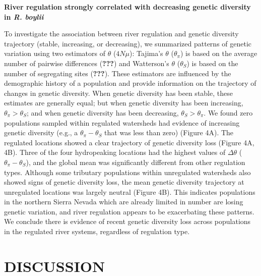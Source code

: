 \documentclass[proquest,12pt,final]{ucthesis-CA2012} %
\begin{document}
\begin{ucmainmatter}
\clearpage

\textbf{River regulation strongly correlated with decreasing genetic
diversity in \emph{R. boylii} }

To investigate the association between river regulation and genetic
diversity trajectory (stable, increasing, or decreasing), we summarized
patterns of genetic variation using two estimators of \(\theta\)
(\(4N\mu\)): Tajima's \(\theta\) (\(\theta_\pi\)) is based on the
average number of pairwise differences ({\textbf{???}}) and Watterson's
\(\theta\) (\(\theta_S\)) is based on the number of segregating sites
({\textbf{???}}). These estimators are influenced by the demographic
history of a population and provide information on the trajectory of
changes in genetic diversity. When genetic diversity has been stable,
these estimates are generally equal; but when genetic diversity has been
increasing, \(\theta_\pi > \theta_S\); and when genetic diversity has
been decreasing, \(\theta_S > \theta_\pi\). We found zero populations
sampled within regulated watersheds had evidence of increasing genetic
diversity (e.g., a \(\theta_\pi - \theta_S\) that was less than zero)
(Figure 4A). The regulated locations showed a clear trajectory of
genetic diversity loss (Figure 4A, 4B). Three of the four hydropeaking
locations had the highest values of \(\Delta\theta\)
(\(\theta_\pi - \theta_S\)), and the global mean was significantly
different from other regulation types. Although some tributary
populations within unregulated watersheds also showed signs of genetic
diversity loss, the mean genetic diversity trajectory at unregulated
locations was largely neutral (Figure 4B). This indicates populations in
the northern Sierra Nevada which are already limited in number are
losing genetic variation, and river regulation appears to be
exacerbating these patterns. We conclude there is evidence of recent
genetic diversity loss across populations in the regulated river
systems, regardless of regulation type.

\clearpage

\hypertarget{discussion}{%
\section{DISCUSSION}\label{discussion}}


\end{ucmainmatter}
\end{document}
